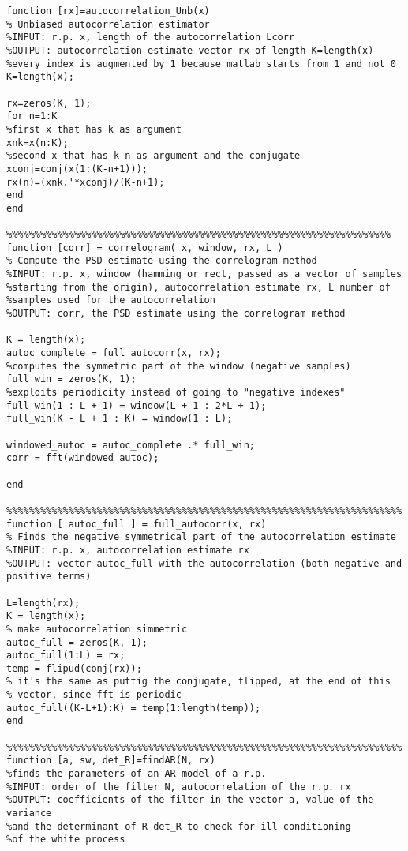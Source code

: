 \documentclass[a4paper,10pt]{article}
\begin{document}
\begin{verbatim}
function [rx]=autocorrelation_Unb(x)
% Unbiased autocorrelation estimator
%INPUT: r.p. x, length of the autocorrelation Lcorr
%OUTPUT: autocorrelation estimate vector rx of length K=length(x)
%every index is augmented by 1 because matlab starts from 1 and not 0
K=length(x);

rx=zeros(K, 1);
for n=1:K
%first x that has k as argument
xnk=x(n:K);
%second x that has k-n as argument and the conjugate
xconj=conj(x(1:(K-n+1)));
rx(n)=(xnk.'*xconj)/(K-n+1);
end
end

%%%%%%%%%%%%%%%%%%%%%%%%%%%%%%%%%%%%%%%%%%%%%%%%%%%%%%%%%%%%%%%%%%%%
function [corr] = correlogram( x, window, rx, L )
% Compute the PSD estimate using the correlogram method
%INPUT: r.p. x, window (hamming or rect, passed as a vector of samples
%starting from the origin), autocorrelation estimate rx, L number of
%samples used for the autocorrelation
%OUTPUT: corr, the PSD estimate using the correlogram method

K = length(x);
autoc_complete = full_autocorr(x, rx);
%computes the symmetric part of the window (negative samples)
full_win = zeros(K, 1);
%exploits periodicity instead of going to "negative indexes"
full_win(1 : L + 1) = window(L + 1 : 2*L + 1);
full_win(K - L + 1 : K) = window(1 : L);

windowed_autoc = autoc_complete .* full_win;
corr = fft(windowed_autoc);

end

%%%%%%%%%%%%%%%%%%%%%%%%%%%%%%%%%%%%%%%%%%%%%%%%%%%%%%%%%%%%%%%%%%%%%%
function [ autoc_full ] = full_autocorr(x, rx)
% Finds the negative symmetrical part of the autocorrelation estimate 
%INPUT: r.p. x, autocorrelation estimate rx
%OUTPUT: vector autoc_full with the autocorrelation (both negative and positive terms) 

L=length(rx);
K = length(x);
% make autocorrelation simmetric
autoc_full = zeros(K, 1);
autoc_full(1:L) = rx;
temp = flipud(conj(rx));
% it's the same as puttig the conjugate, flipped, at the end of this
% vector, since fft is periodic
autoc_full((K-L+1):K) = temp(1:length(temp));
end

%%%%%%%%%%%%%%%%%%%%%%%%%%%%%%%%%%%%%%%%%%%%%%%%%%%%%%%%%%%%%%%%%%%%%%
function [a, sw, det_R]=findAR(N, rx)
%finds the parameters of an AR model of a r.p.
%INPUT: order of the filter N, autocorrelation of the r.p. rx
%OUTPUT: coefficients of the filter in the vector a, value of the variance
%and the determinant of R det_R to check for ill-conditioning
%of the white process


\end{verbatim}
\end{document}
